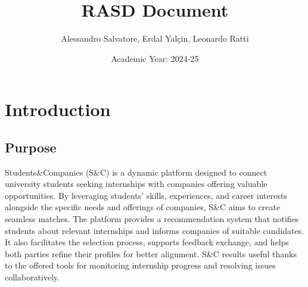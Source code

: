 \documentclass{article}
\begin{document}
\title{RASD Document}
\author{Alessandro Salvatore, Erdal Yalçin, Leonardo Ratti}
\date{Academic Year: 2024-25}
\maketitle

\newpage
\tableofcontents

\newpage
\section{Introduction}
\subsection{Purpose}
Students\&Companies (S\&C) is a dynamic platform designed to connect university students seeking internships with companies offering valuable opportunities. By leveraging students' skills, experiences, and career interests alongside the specific needs and offerings of companies, S\&C aims to create seamless matches. The platform provides a recommendation system that notifies students about relevant internships and informs companies of suitable candidates. It also facilitates the selection process, supports feedback exchange, and helps both parties refine their profiles for better alignment. S\&C results useful thanks to the offered tools for monitoring internship progress and resolving issues collaboratively.
\end{document}
